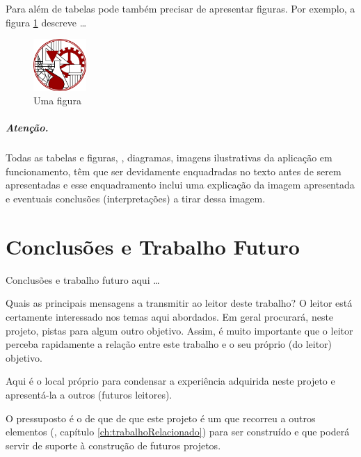 Para além de tabelas pode também precisar de apresentar figuras. Por exemplo, a figura \ref{fig:umafigura} descreve \ldots
\begin{figure}[h]
   \centering
   \includegraphics[width=2cm]{./fig_logo_ISEL}
\caption{Uma figura}
\label{fig:umafigura}
\end{figure}

\paragraph{Atenção.} Todas as tabelas e figuras, \eg, diagramas, imagens ilustrativas da aplicação em funcionamento, têm que ser devidamente enquadradas no texto antes de serem apresentadas e esse enquadramento inclui uma explicação da imagem apresentada e eventuais conclusões (interpretações) a tirar dessa imagem.


\chapter{Conclusões e Trabalho Futuro}
\label{ch:conclusoesTrabalhoFuturo}

Conclusões e trabalho futuro aqui \ldots

Quais as principais mensagens a transmitir ao leitor deste trabalho? O leitor está certamente interessado nos temas aqui abordados. Em geral procurará, neste projeto, pistas para algum outro objetivo. Assim, é muito importante que o leitor perceba rapidamente a relação entre este trabalho e o seu próprio (do leitor) objetivo.

Aqui é o local próprio para condensar a experiência adquirida neste projeto e apresentá-la a outros (futuros leitores).

O pressuposto é o de que de que este projeto é um  que recorreu a outros elementos (\cf, capítulo \ref{ch:trabalhoRelacionado}) para ser construído e que poderá servir de suporte à construção de futuros projetos.








